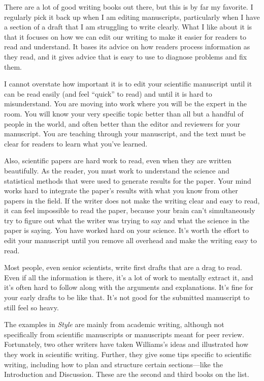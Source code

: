 \documentclass[]{tufte-book}
\begin{document}
There are a lot of good writing books out there, but this is by far my favorite.
I regularly pick it back up when I am editing manuscripts, particularly when I have
a section of a draft that I am struggling to write clearly. What I like about it
is that it focuses on how we can edit our writing to make it easier for readers
to read and understand. It bases its advice on how readers process information as
they read, and it gives advice that is easy to use to diagnose problems and
fix them.

I cannot overstate how important it is to edit your scientific manuscript until
it can be read easily (and feel ``quick'' to read) and until it is hard to
misunderstand. You are moving into work where you will be the expert in the
room. You will know your very specific topic better than all but a handful of
people in the world, and often better than the editor and reviewers
for your manuscript. You are teaching through your manuscript, and the text
must be clear for readers to learn what you've learned.

Also, scientific papers are hard work to read, even when they are written
beautifully. As the reader, you must work to understand the science and
statistical methods that were used to generate results for the paper. Your mind
works hard to integrate the paper's results with what you know from other papers
in the field. If the writer does not make the writing clear and easy to read, it
can feel impossible to read the paper, because your brain can't simultaneously
try to figure out what the writer was trying to say and what the science in the
paper is saying. You have worked hard on your science. It's worth the effort to
edit your manuscript until you remove all overhead and make the writing easy to
read.

Most people, even senior scientists, write first drafts that are a
drag to read. Even if all the information is there, it's a lot of work to
mentally extract it, and it's often hard to follow along with the arguments and
explanations. It's fine for your early drafts to be like that. It's not good for
the submitted manuscript to still feel so heavy.

The examples in \emph{Style} are mainly from academic writing, although not
specifically from scientific manuscripts or manuscripts meant for peer review.
Fortunately, two other writers have taken Williams's ideas and illustrated
how they work in scientific writing. Further, they give some tips specific to
scientific writing, including how to plan and structure certain sections---like the
Introduction and Discussion. These are the second and third books on the list.
\end{document}
